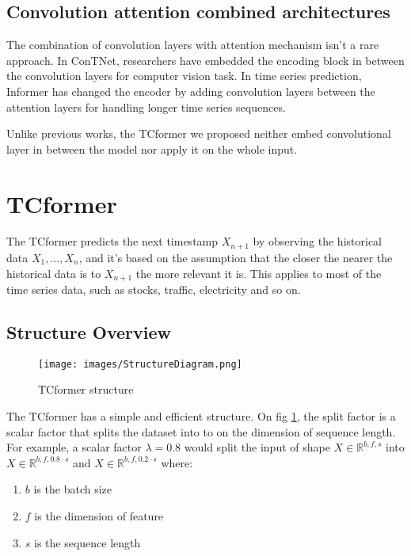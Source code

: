\documentclass[stu,12pt,floatsintext]{apa7}
\begin{document}
\subsection{Convolution attention combined architectures}

The combination of convolution layers with attention mechanism isn't a rare approach. In ConTNet, researchers have embedded the encoding block in between the convolution layers \parencite{yan2021contnetuseconvolutiontransformer} for computer vision task. In time series prediction, Informer \parencite{informer} has changed the encoder by adding convolution layers between the attention layers for handling longer time series sequences. 

Unlike previous works, the TCformer we proposed neither embed convolutional layer in between the model nor apply it on the whole input. 

\section{TCformer}

The TCformer predicts the next timestamp $X_{n+1}$ by observing the historical data $X_1,..., X_n$, and it's based on the assumption that the closer the nearer the historical data is to $X_{n+1}$ the more relevant it is. This applies to most of the time series data, such as stocks, traffic, electricity and so on. 

\subsection{Structure Overview}

\begin{figure}[H]
    \caption{TCformer structure}
    \centering
    \texttt{[image: images/StructureDiagram.png]}
    \label{fig:TCformer-structure}
\end{figure}

The TCformer has a simple and efficient structure. On fig \ref{fig:TCformer-structure}, the split factor is a scalar factor that splits the dataset into to on the dimension of sequence length. For example, a scalar factor $\lambda=0.8$ would split the input of shape $X\in \mathbb{R}^{b,f,s}$ into $X\in \mathbb{R}^{b,f,0.8\cdot s}$ and $X\in \mathbb{R}^{b,f,0.2\cdot s}$ where:

\begin{enumerate}
    \item $b$ is the batch size
    \item $f$ is the dimension of feature
    \item $s$ is the sequence length
\end{enumerate}
\end{document}
